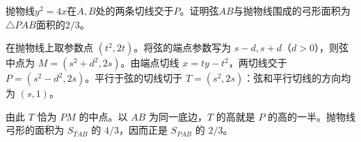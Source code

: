 抛物线\(y^2=4x\)在\(A,B\)处的两条切线交于\(P\)。证明弦\(AB\)与抛物线围成的弓形面积为\(\triangle PAB\)面积的\(2/3\)。
\par
\solutionanswer
在抛物线上取参数点 \((t^2,2t)\)。将弦的端点参数写为 \(s-d,s+d\)（\(d>0\)），则弦中点为 \(M=(s^2+d^2,2s)\)。由端点切线 \(x=ty-t^2\)，两切线交于 \(P=(s^2-d^2,2s)\)。平行于弦的切线切于 \(T=(s^2,2s)\)：弦和平行切线的方向均为 \((s,1)\)。

由此 \(T\) 恰为 \(PM\) 的中点。以 \(AB\) 为同一底边，\(T\) 的高就是 \(P\) 的高的一半。抛物线弓形的面积为 \(S_{TAB}\) 的 \(4/3\)，因而正是 \(S_{PAB}\) 的 \(2/3\)。
\par
